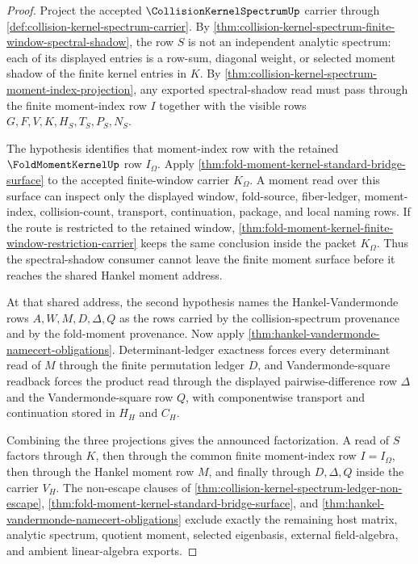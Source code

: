 \begin{proof}
Project the accepted $\CollisionKernelSpectrumUp$ carrier through \autoref{def:collision-kernel-spectrum-carrier}. By \autoref{thm:collision-kernel-spectrum-finite-window-spectral-shadow}, the row $S$ is not an independent analytic spectrum: each of its displayed entries is a row-sum, diagonal weight, or selected moment shadow of the finite kernel entries in $K$. By \autoref{thm:collision-kernel-spectrum-moment-index-projection}, any exported spectral-shadow read must pass through the finite moment-index row $I$ together with the visible rows $G,F,V,K,H_S,T_S,P_S,N_S$.

The hypothesis identifies that moment-index row with the retained $\FoldMomentKernelUp$ row $I_{\Omega}$. Apply \autoref{thm:fold-moment-kernel-standard-bridge-surface} to the accepted finite-window carrier $K_{\Omega}$. A moment read over this surface can inspect only the displayed window, fold-source, fiber-ledger, moment-index, collision-count, transport, continuation, package, and local naming rows. If the route is restricted to the retained window, \autoref{thm:fold-moment-kernel-finite-window-restriction-carrier} keeps the same conclusion inside the packet $K_{\Omega}$. Thus the spectral-shadow consumer cannot leave the finite moment surface before it reaches the shared Hankel moment address.

At that shared address, the second hypothesis names the Hankel-Vandermonde rows $A,W,M,D,\Delta,Q$ as the rows carried by the collision-spectrum provenance and by the fold-moment provenance. Now apply \autoref{thm:hankel-vandermonde-namecert-obligations}. Determinant-ledger exactness forces every determinant read of $M$ through the finite permutation ledger $D$, and Vandermonde-square readback forces the product read through the displayed pairwise-difference row $\Delta$ and the Vandermonde-square row $Q$, with componentwise transport and continuation stored in $H_H$ and $C_H$.

Combining the three projections gives the announced factorization. A read of $S$ factors through $K$, then through the common finite moment-index row $I=I_{\Omega}$, then through the Hankel moment row $M$, and finally through $D,\Delta,Q$ inside the carrier $V_H$. The non-escape clauses of \autoref{thm:collision-kernel-spectrum-ledger-non-escape}, \autoref{thm:fold-moment-kernel-standard-bridge-surface}, and \autoref{thm:hankel-vandermonde-namecert-obligations} exclude exactly the remaining host matrix, analytic spectrum, quotient moment, selected eigenbasis, external field-algebra, and ambient linear-algebra exports.
\end{proof}
